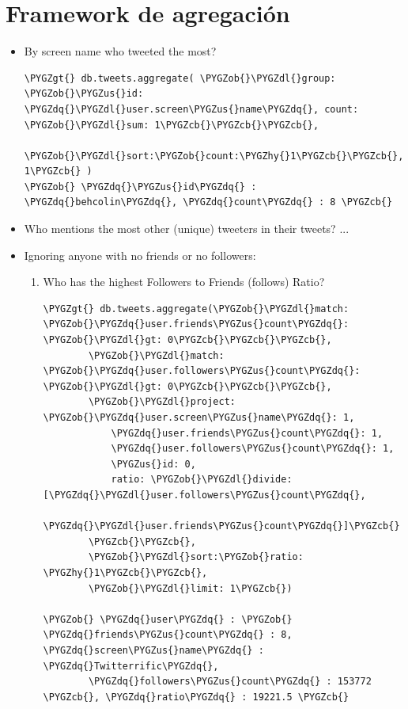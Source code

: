 \documentclass[a4paper,10pt,english]{sphinxmanual}
\def\PYGZus{\char`\_}
\def\PYGZob{\char`\{}
\def\PYGZcb{\char`\}}
\def\PYGZgt{\char`\>}
\def\PYGZdl{\char`\$}
\def\PYGZhy{\char`\-}
\def\PYGZdq{\char`\"}
\begin{document}
\section{Framework de agregación}
\label{contents/ejercicios:framework-de-agregacion}\begin{itemize}
\item {} 
By screen name who tweeted the most?

\begin{Verbatim}[commandchars=\\\{\}]
\PYGZgt{} db.tweets.aggregate( \PYGZob{}\PYGZdl{}group: \PYGZob{}\PYGZus{}id: \PYGZdq{}\PYGZdl{}user.screen\PYGZus{}name\PYGZdq{}, count: \PYGZob{}\PYGZdl{}sum: 1\PYGZcb{}\PYGZcb{}\PYGZcb{},
        \PYGZob{}\PYGZdl{}sort:\PYGZob{}count:\PYGZhy{}1\PYGZcb{}\PYGZcb{},\PYGZob{}\PYGZdl{}limit: 1\PYGZcb{} )
\PYGZob{} \PYGZdq{}\PYGZus{}id\PYGZdq{} : \PYGZdq{}behcolin\PYGZdq{}, \PYGZdq{}count\PYGZdq{} : 8 \PYGZcb{}
\end{Verbatim}

\item {} 
Who mentions the most other (unique) tweeters in their tweets? ...

\item {} 
Ignoring anyone with no friends or no followers:
\begin{enumerate}
\item {} 
Who has the highest Followers to Friends (follows) Ratio?

\begin{Verbatim}[commandchars=\\\{\}]
\PYGZgt{} db.tweets.aggregate(\PYGZob{}\PYGZdl{}match: \PYGZob{}\PYGZdq{}user.friends\PYGZus{}count\PYGZdq{}: \PYGZob{}\PYGZdl{}gt: 0\PYGZcb{}\PYGZcb{}\PYGZcb{},
        \PYGZob{}\PYGZdl{}match: \PYGZob{}\PYGZdq{}user.followers\PYGZus{}count\PYGZdq{}: \PYGZob{}\PYGZdl{}gt: 0\PYGZcb{}\PYGZcb{}\PYGZcb{},
        \PYGZob{}\PYGZdl{}project: \PYGZob{}\PYGZdq{}user.screen\PYGZus{}name\PYGZdq{}: 1,
            \PYGZdq{}user.friends\PYGZus{}count\PYGZdq{}: 1,
            \PYGZdq{}user.followers\PYGZus{}count\PYGZdq{}: 1,
            \PYGZus{}id: 0,
            ratio: \PYGZob{}\PYGZdl{}divide:[\PYGZdq{}\PYGZdl{}user.followers\PYGZus{}count\PYGZdq{},
                             \PYGZdq{}\PYGZdl{}user.friends\PYGZus{}count\PYGZdq{}]\PYGZcb{}
        \PYGZcb{}\PYGZcb{},
        \PYGZob{}\PYGZdl{}sort:\PYGZob{}ratio: \PYGZhy{}1\PYGZcb{}\PYGZcb{},
        \PYGZob{}\PYGZdl{}limit: 1\PYGZcb{})

\PYGZob{} \PYGZdq{}user\PYGZdq{} : \PYGZob{} \PYGZdq{}friends\PYGZus{}count\PYGZdq{} : 8, \PYGZdq{}screen\PYGZus{}name\PYGZdq{} : \PYGZdq{}Twitterrific\PYGZdq{},
        \PYGZdq{}followers\PYGZus{}count\PYGZdq{} : 153772 \PYGZcb{}, \PYGZdq{}ratio\PYGZdq{} : 19221.5 \PYGZcb{}
\end{Verbatim}


\end{enumerate}
\end{itemize}
\end{document}
